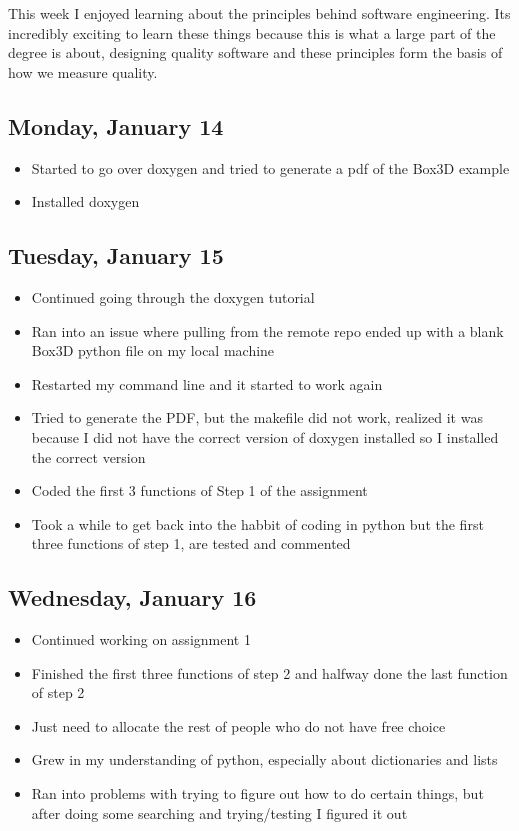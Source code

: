 \documentclass{article}
\begin{document}
This week I enjoyed learning about the principles behind software engineering. Its incredibly exciting to learn these things because this is what a large part of the degree is about, designing quality software and these principles form the basis of how we measure quality.

\subsection{Monday, January 14}
\begin{itemize}
    \item Started to go over doxygen and tried to generate a pdf of the Box3D example
    \item Installed doxygen
\end{itemize}

\subsection{Tuesday, January 15}
\begin{itemize}
    \item Continued going through the doxygen tutorial
    \item Ran into an issue where pulling from the remote repo ended up with a blank Box3D python file on my local machine
    \item Restarted my command line and it started to work again
    \item Tried to generate the PDF, but the makefile did not work, realized it was because I did not have the correct version of doxygen installed so I installed the correct version
    \item Coded the first 3 functions of Step 1 of the assignment
    \item Took a while to get back into the habbit of coding in python but the first three functions of step 1, are tested and commented
\end{itemize}

\subsection{Wednesday, January 16}
\begin{itemize}
    \item Continued working on assignment 1
    \item Finished the first three functions of step 2 and halfway done the last function of step 2
    \item Just need to allocate the rest of people who do not have free choice
    \item Grew in my understanding of python, especially about dictionaries and lists
    \item Ran into problems with trying to figure out how to do certain things, but after doing some searching and trying/testing I figured it out
\end{itemize}
\end{document}
